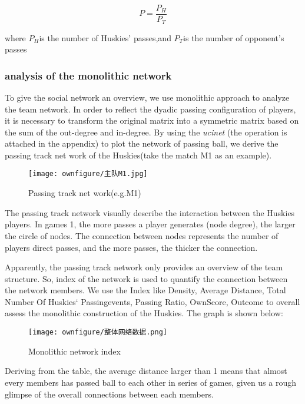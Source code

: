 \documentclass{mcmthesis}
\begin{document}
\[
P=\frac{P_{H}}{P_{T}}
\]

where $P_{H}$is the number of Huskies' passes,and $P_{T}$is the
number of opponent's passes

\subsubsection{analysis of the monolithic network}

To give the social network an overview, we use monolithic approach to analyze the team network.
In order to reflect the dyadic passing configuration of players, it is necessary to transform
the original matrix into a symmetric matrix based on the sum of the out-degree and in-degree.
By using the \textit{ucinet} (the operation is attached in the appendix) to plot the network of passing ball, we derive the passing track
net work of the Huskies(take the match M1 as an example).

\begin{figure}[h]
\small
\centering
\texttt{[image: ownfigure/主队M1.jpg]}
\caption{Passing track net work(e.g.M1)} 
\end{figure}

The passing track network visually describe the interaction between the Huskies players.
In games 1, the more passes a player generates (node degree), the larger the circle of nodes.
The connection between nodes represents the number of players direct passes, and the more passes,
the thicker the connection. 

Apparently, the passing track network only provides an overview of the team structure.
So, index of the network is used to quantify the connection between the 
network members. We use the Index like Density, Average Distance, Total Number Of Huskies‘ Passingevents,
Passing Ratio, OwnScore, Outcome to overall assess the monolithic construction of the Huskies.
The graph is shown below:
\begin{figure}[h]
  \large
  \centering
  \texttt{[image: ownfigure/整体网络数据.png]}
  \caption{Monolithic network index} 
  \end{figure}
      
Deriving from the table, the average distance larger than 1 means that almost every members has passed ball
to each other in series of games, given us a rough glimpse of the overall connections between each members.
\end{document}
